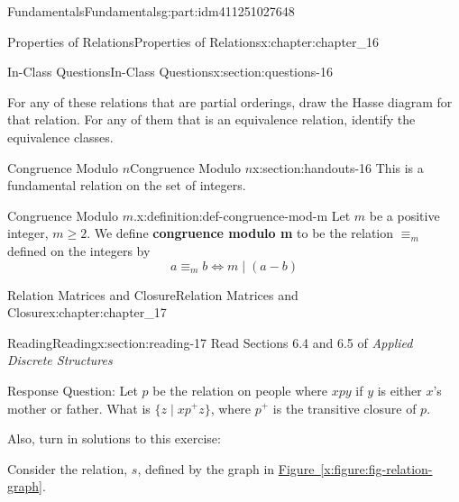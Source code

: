 \documentclass[oneside,10pt,]{book}
\newcommand{\xreffont}{\relax}
\newcommand{\terminology}[1]{\textbf{#1}}
\numberwithin{equation}{section}
\begin{document}
\begin{partptx}{Fundamentals}{}{Fundamentals}{}{}{g:part:idm411251027648}
\begin{chapterptx}{Properties of Relations}{}{Properties of Relations}{}{}{x:chapter:chapter_16}
\begin{sectionptx}{In-Class Questions}{}{In-Class Questions}{}{}{x:section:questions-16}
\begin{enumerate}[label=\arabic*.]
\begin{enumerate}[label=(\alph*)]
\end{enumerate}
For any of these relations that are partial orderings, draw the Hasse diagram for that relation.  For any of them that is an equivalence relation, identify the equivalence classes.%
\end{enumerate}
%
\end{sectionptx}
%
%
\typeout{************************************************}
\typeout{************************************************}
%
\begin{sectionptx}{Congruence Modulo \(n\)}{}{Congruence Modulo \(n\)}{}{}{x:section:handouts-16}
This is a fundamental relation on the set of integers.%
\begin{definition}{Congruence Modulo \(m\).}{x:definition:def-congruence-mod-m}%
%
\label{g:notation:idm411250538480}%
\label{g:notation:idm411250536704}%
Let \(m\) be a positive integer, \(m\geq 2\).  We define \terminology{congruence modulo m} to be the relation \(\equiv_m\) defined on the integers by%
\begin{equation*}
a \equiv_m b \Leftrightarrow m \mid (a-b)
\end{equation*}
%
\end{definition}
\end{sectionptx}
\end{chapterptx}
%
\typeout{************************************************}
\typeout{************************************************}
%
\begin{chapterptx}{Relation Matrices and Closure}{}{Relation Matrices and Closure}{}{}{x:chapter:chapter_17}
\index{}%
%
%
\typeout{************************************************}
\typeout{************************************************}
%
\begin{sectionptx}{Reading}{}{Reading}{}{}{x:section:reading-17}
Read Sections 6.4 and 6.5 of \emph{Applied Discrete Structures}%
\par
Response Question: Let \(p\) be the relation on people where \(x p y\) if \(y\) is either \(x\)'s mother or father.   What is \(\{z \mid x p^+ z\}\), where \(p^+\) is the transitive closure of \(p\).%
\par
Also, turn in solutions to this exercise:%
\par
Consider the relation, \(s\), defined by the graph in \hyperref[x:figure:fig-relation-graph]{Figure~{\xreffont\ref{x:figure:fig-relation-graph}}}.%

\end{sectionptx}
\end{chapterptx}
\end{partptx}
\end{document}

